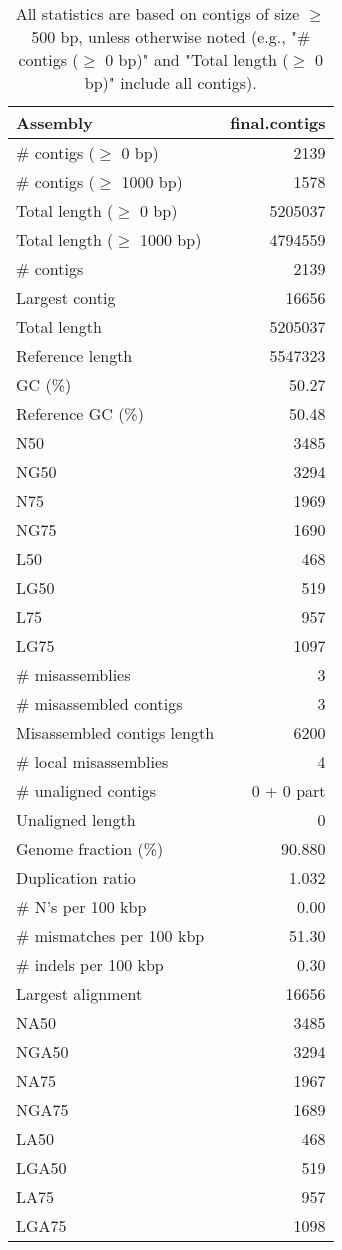 \documentclass[12pt,a4paper]{article}
\begin{document}
\begin{table}[ht]
\begin{center}
\caption{All statistics are based on contigs of size $\geq$ 500 bp, unless otherwise noted (e.g., "\# contigs ($\geq$ 0 bp)" and "Total length ($\geq$ 0 bp)" include all contigs).}
\begin{tabular}{|l*{1}{|r}|}
\hline
Assembly & final.contigs \\ \hline
\# contigs ($\geq$ 0 bp) & 2139 \\ \hline
\# contigs ($\geq$ 1000 bp) & 1578 \\ \hline
Total length ($\geq$ 0 bp) & 5205037 \\ \hline
Total length ($\geq$ 1000 bp) & 4794559 \\ \hline
\# contigs & 2139 \\ \hline
Largest contig & 16656 \\ \hline
Total length & 5205037 \\ \hline
Reference length & 5547323 \\ \hline
GC (\%) & 50.27 \\ \hline
Reference GC (\%) & 50.48 \\ \hline
N50 & 3485 \\ \hline
NG50 & 3294 \\ \hline
N75 & 1969 \\ \hline
NG75 & 1690 \\ \hline
L50 & 468 \\ \hline
LG50 & 519 \\ \hline
L75 & 957 \\ \hline
LG75 & 1097 \\ \hline
\# misassemblies & 3 \\ \hline
\# misassembled contigs & 3 \\ \hline
Misassembled contigs length & 6200 \\ \hline
\# local misassemblies & 4 \\ \hline
\# unaligned contigs & 0 + 0 part \\ \hline
Unaligned length & 0 \\ \hline
Genome fraction (\%) & 90.880 \\ \hline
Duplication ratio & 1.032 \\ \hline
\# N's per 100 kbp & 0.00 \\ \hline
\# mismatches per 100 kbp & 51.30 \\ \hline
\# indels per 100 kbp & 0.30 \\ \hline
Largest alignment & 16656 \\ \hline
NA50 & 3485 \\ \hline
NGA50 & 3294 \\ \hline
NA75 & 1967 \\ \hline
NGA75 & 1689 \\ \hline
LA50 & 468 \\ \hline
LGA50 & 519 \\ \hline
LA75 & 957 \\ \hline
LGA75 & 1098 \\ \hline
\end{tabular}
\end{center}
\end{table}
\end{document}
